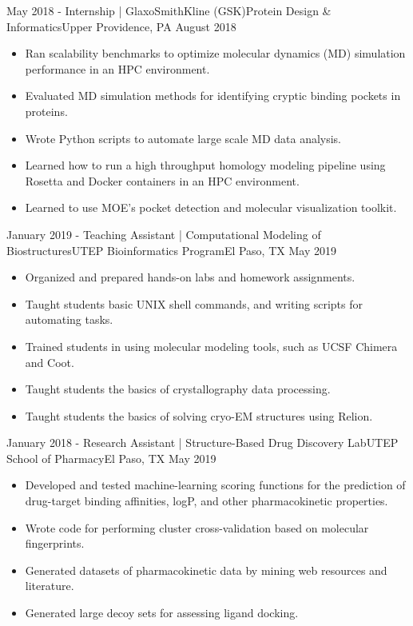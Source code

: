 \begin{experiences}
  \experience
    {May 2018 -} {Internship | GlaxoSmithKline (GSK)}{Protein Design \& Informatics}{Upper Providence, PA}
    {August 2018} {
        \begin{itemize}
        \item Ran scalability benchmarks to optimize molecular dynamics (MD) simulation performance in an HPC environment.
        \item Evaluated MD simulation methods for identifying cryptic binding pockets in proteins.
        \item Wrote Python scripts to automate large scale MD data analysis.
        \item Learned how to run a high throughput homology modeling pipeline using Rosetta and Docker containers in an HPC environment.
        \item Learned to use MOE's pocket detection and molecular visualization toolkit.
        \end{itemize}
    }

  \emptySeparator

  \experience
    {January 2019 -} {Teaching Assistant | Computational Modeling of Biostructures}{UTEP Bioinformatics Program}{El Paso, TX}
    {May 2019}    {
        \begin{itemize}
        \item Organized and prepared hands-on labs and homework assignments.
        \item Taught students basic UNIX shell commands, and writing scripts for automating tasks.
        \item Trained students in using molecular modeling tools, such as UCSF Chimera and Coot.
        \item Taught students the basics of crystallography data processing.
        \item Taught students the basics of solving  cryo-EM structures using Relion.
        \end{itemize}
    }

  \emptySeparator

  \experience
    {January 2018 -} {Research Assistant | Structure-Based Drug Discovery Lab}{UTEP School of Pharmacy}{El Paso, TX}
    {May 2019} {
        \begin{itemize}
        \item Developed and tested machine-learning scoring functions for the prediction of drug-target binding affinities, logP, and other pharmacokinetic properties.
        \item Wrote code for performing cluster cross-validation based on molecular fingerprints.
        \item Generated datasets of pharmacokinetic data by mining web resources and literature.
        \item Generated large decoy sets for assessing ligand docking.
        \end{itemize}
    }


\end{experiences}
